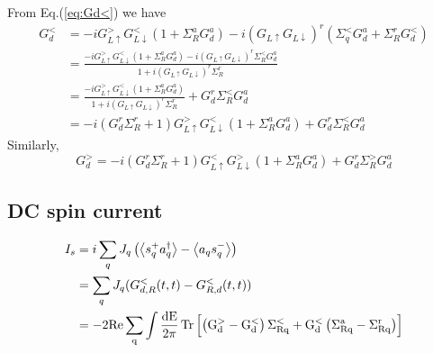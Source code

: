 \documentclass[11pt,a4paper]{article}
\begin{document}
From Eq.(\ref{eq:Gd<}) we have
\begin{equation}
\begin{split}
G_{d}^{<}&=-i G_{L \uparrow}^{>} G_{L \downarrow}^{<}\left(1+\Sigma_{R}^{a} G_{d}^{a}\right)-i\left(G_{L \uparrow} G_{L \downarrow}\right)^{r}\left(\Sigma_{q}^{<} G_{d}^{a}+\Sigma_{R}^{r} G_{d}^{<}\right)\\
&=\frac{-i G_{L \uparrow}^{>} G_{L \downarrow}^{<}\left(1+\Sigma_{R}^{a} G_{d}^{a}\right) - i\left(G_{L \uparrow} G_{L \downarrow}\right)^{r}\Sigma_{R}^{<} G_{d}^{a}}{1+i\left(G_{L \uparrow} G_{L \downarrow}\right)^{r}\Sigma_{R}^{r}} \\
&=\frac{-i G_{L \uparrow}^{>} G_{L \downarrow}^{<}\left(1+\Sigma_{R}^{a} G_{d}^{a}\right)}{1+i\left(G_{L \uparrow} G_{L \downarrow}\right)^{r}\Sigma_{R}^{r}} + G_{d}^{r}\Sigma_{R}^{<} G_{d}^{a}\\
&=-i(G_{d}^{r}\Sigma_{R}^{r}+1) G_{L \uparrow}^{>} G_{L \downarrow}^{<}\left(1+\Sigma_{R}^{a} G_{d}^{a}\right) + G_{d}^{r}\Sigma_{R}^{<} G_{d}^{a}
\end{split}
\end{equation}
Similarly,
\begin{equation}
G_{d}^{>}=-i\left(G_{d}^{r} \Sigma_{R}^{r}+1\right) G_{L \uparrow}^{<} G_{L \downarrow}^{>}\left(1+\Sigma_{R}^{a} G_{d}^{a}\right)+G_{d}^{r} \Sigma_{R}^{>} G_{d}^{a}
\end{equation}
\subsection{DC spin current}

\begin{equation}
\begin{split}
I_{s}&= i \sum_{q} J_{q}\left(\left\langle s_{q}^{+} a_{q}^{\dagger}\right\rangle-\left\langle a_{q} s_{q}^{-}\right\rangle\right) \\
&=\sum_{q}J_{q}(G_{d,R}^{<}(t,t)-G_{R,d}^{<}(t,t)) \\
&= -2\rm{Re}\sum_{q} \int  \frac{dE}{2\pi}\operatorname{Tr}\left[\left(G_{d}^{>}-G_{d}^{<}\right) \Sigma_{R q}^{<}+G_{d}^{<}\left(\Sigma_{R q}^{a}-\Sigma_{R q}^{r}\right)\right]
\end{split}
\label{eq:current1}
\end{equation}
\end{document}
